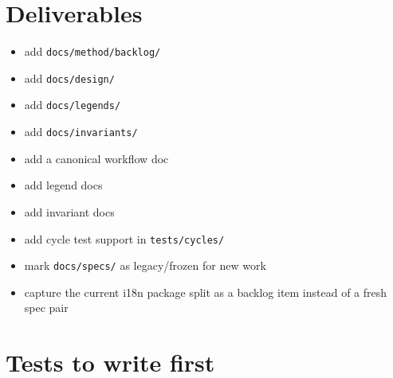 \section{Deliverables}\label{record-200-deliverables}

\begin{itemize}
\tightlist
\item
  add \texttt{d\allowbreak{}o\allowbreak{}c\allowbreak{}s\allowbreak{}/\allowbreak{}m\allowbreak{}e\allowbreak{}t\allowbreak{}h\allowbreak{}o\allowbreak{}d\allowbreak{}/\allowbreak{}b\allowbreak{}a\allowbreak{}c\allowbreak{}k\allowbreak{}l\allowbreak{}o\allowbreak{}g\allowbreak{}/}
\item
  add \texttt{d\allowbreak{}o\allowbreak{}c\allowbreak{}s\allowbreak{}/\allowbreak{}d\allowbreak{}e\allowbreak{}s\allowbreak{}i\allowbreak{}g\allowbreak{}n\allowbreak{}/}
\item
  add \texttt{d\allowbreak{}o\allowbreak{}c\allowbreak{}s\allowbreak{}/\allowbreak{}l\allowbreak{}e\allowbreak{}g\allowbreak{}e\allowbreak{}n\allowbreak{}d\allowbreak{}s\allowbreak{}/}
\item
  add \texttt{d\allowbreak{}o\allowbreak{}c\allowbreak{}s\allowbreak{}/\allowbreak{}i\allowbreak{}n\allowbreak{}v\allowbreak{}a\allowbreak{}r\allowbreak{}i\allowbreak{}a\allowbreak{}n\allowbreak{}t\allowbreak{}s\allowbreak{}/}
\item
  add a canonical workflow doc
\item
  add legend docs
\item
  add invariant docs
\item
  add cycle test support in \texttt{t\allowbreak{}e\allowbreak{}s\allowbreak{}t\allowbreak{}s\allowbreak{}/\allowbreak{}c\allowbreak{}y\allowbreak{}c\allowbreak{}l\allowbreak{}e\allowbreak{}s\allowbreak{}/}
\item
  mark \texttt{d\allowbreak{}o\allowbreak{}c\allowbreak{}s\allowbreak{}/\allowbreak{}s\allowbreak{}p\allowbreak{}e\allowbreak{}c\allowbreak{}s\allowbreak{}/} as legacy/frozen for new work
\item
  capture the current i18n package split as a backlog item instead of a fresh spec pair
\end{itemize}

\section{Tests to write first}\label{record-200-tests-to-write-first}

